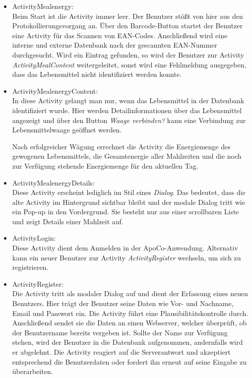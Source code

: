\begin{itemize}
 \item ActivityMealenergy:\\
 Beim Start ist die Activity immer leer.
 Der Benutzer st\"o\ss{}t von hier aus den Protokollierungsvorgang an.
 \"Uber den Barcode-Button startet der Benutzer eine Activity f\"ur das Scannen von EAN-Codes.
 Anschlie\ss{}end wird eine interne und externe Datenbank nach der gescannten EAN-Nummer durchgesucht.
 Wird ein Eintrag gefunden, so wird der Benutzer zur Activity \emph{ActivityMealContent} weitergeleitet, sonst wird eine Fehlmeldung ausgegeben, dass das Lebensmittel
 nicht identifiziert werden konnte.

 \item ActivityMealenergyContent:\\
 In diese Activity gelangt man nur, wenn das Lebensmittel in der Datenbank identifiziert wurde. 
 Hier werden Detailinformationen \"uber das Lebensmittel angezeigt 
 und \"uber den Button \emph{Waage verbinden?} kann eine Verbindung zur Lebensmittelwaage ge\"offnet werden. 
 
 Nach erfolgreicher W\"agung errechnet die Activity die Energiemenge des gewogenen Lebensmittels, 
 die Gesamtenergie aller Mahlzeiten und
 die noch zur Verf\"ugung stehende Energiemenge f\"ur den aktuellen Tag.

 \item ActivityMealenergyDetails:\\
 Diese Activity erscheint lediglich im Stil eines \emph{Dialog}.
 Das bedeutet, dass die alte Activity im Hintergrund sichtbar bleibt  
 und der modale Dialog tritt wie ein Pop-up in den Vordergrund. 
 Sie besteht nur aus einer scrollbaren Liste und zeigt Details einer Mahlzeit auf.

 \item ActivityLogin:\\
 Diese Activity dient dem Anmelden in der ApoCo-Anwendung.
 Alternativ kann ein neuer Benutzer zur Activity \emph{ActivityRegister} wechseln, um sich zu registrieren. 
 
 \item ActivityRegister:\\
 Die Activity tritt als modaler Dialog auf und dient der Erfassung eines neuen Benutzers.
 Hier tr\"agt der Benutzer seine Daten wie Vor- und Nachname, Email und Passwort ein.
 Die Activity f\"uhrt eine Plausibilit\"atskontrolle durch.
 Anschlie\ss{}end sendet sie die Daten an einen Webserver, welcher \"uberpr\"uft, 
 ob der Benutzername bereits vergeben ist. 
 Sollte der Name zur Verf\"ugung stehen, wird der Benutzer in die Datenbank aufgenommen, 
 andernfalls wird er abgelehnt. 
 Die Activity reagiert auf die Serverantwort und akzeptiert entsprechend die Benutzerdaten 
 oder fordert ihn erneut auf seine Eingabe zu \"uberarbeiten.
 

\end{itemize}
